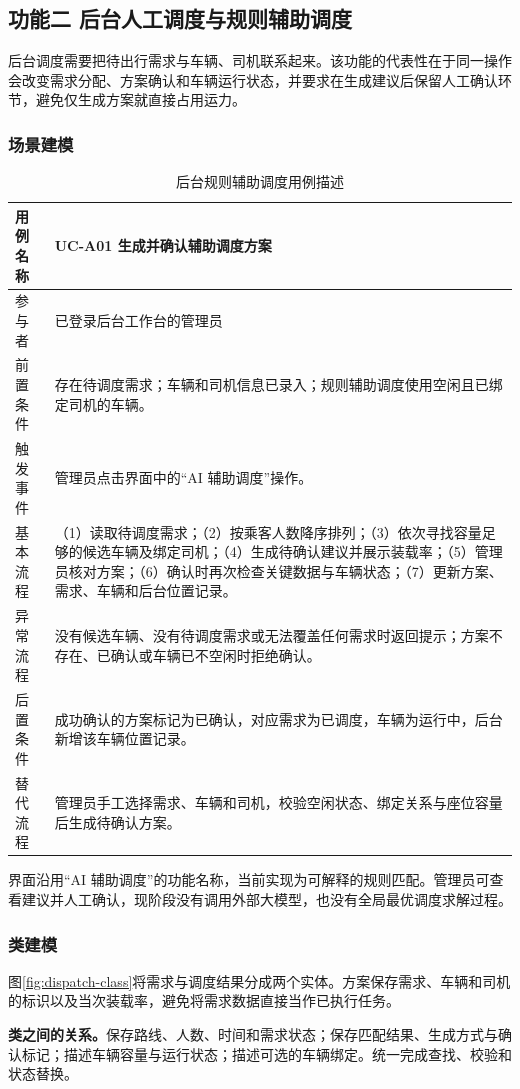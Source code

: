 \subsection{功能二 后台人工调度与规则辅助调度}
后台调度需要把待出行需求与车辆、司机联系起来。该功能的代表性在于同一操作会改变需求分配、方案确认和车辆运行状态，并要求在生成建议后保留人工确认环节，避免仅生成方案就直接占用运力。

\subsubsection{场景建模}
\begin{table}[H]\centering\small
\caption{后台规则辅助调度用例描述}
\begin{tabularx}{\linewidth}{|P{2cm}|Y|}\hline
用例名称 & UC-A01 生成并确认辅助调度方案\\\hline
参与者 & 已登录后台工作台的管理员\\\hline
前置条件 & 存在待调度需求；车辆和司机信息已录入；规则辅助调度使用空闲且已绑定司机的车辆。\\\hline
触发事件 & 管理员点击界面中的“AI 辅助调度”操作。\\\hline
基本流程 & （1）读取待调度需求；（2）按乘客人数降序排列；（3）依次寻找容量足够的候选车辆及绑定司机；（4）生成待确认建议并展示装载率；（5）管理员核对方案；（6）确认时再次检查关键数据与车辆状态；（7）更新方案、需求、车辆和后台位置记录。\\\hline
异常流程 & 没有候选车辆、没有待调度需求或无法覆盖任何需求时返回提示；方案不存在、已确认或车辆已不空闲时拒绝确认。\\\hline
后置条件 & 成功确认的方案标记为已确认，对应需求为已调度，车辆为运行中，后台新增该车辆位置记录。\\\hline
替代流程 & 管理员手工选择需求、车辆和司机，校验空闲状态、绑定关系与座位容量后生成待确认方案。\\\hline
\end{tabularx}\end{table}
界面沿用“AI 辅助调度”的功能名称，当前实现为可解释的规则匹配。管理员可查看建议并人工确认，现阶段没有调用外部大模型，也没有全局最优调度求解过程。

\subsubsection{类建模}
图\ref{fig:dispatch-class}将需求与调度结果分成两个实体。方案保存需求、车辆和司机的标识以及当次装载率，避免将需求数据直接当作已执行任务。

\noindent\textbf{类之间的关系。}保存路线、人数、时间和需求状态；保存匹配结果、生成方式与确认标记；描述车辆容量与运行状态；描述可选的车辆绑定。统一完成查找、校验和状态替换。

